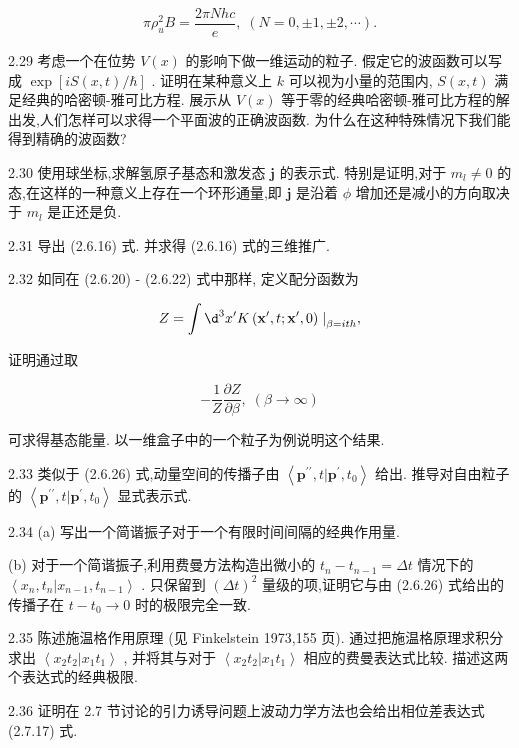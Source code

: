 $$
\pi {\rho }_{u}^{2}B = \frac{2\pi Nhc}{e},\;\left( {N = 0, \pm 1, \pm 2,\cdots }\right) .
$$

2.29 考虑一个在位势 $V\left( x\right)$ 的影响下做一维运动的粒子. 假定它的波函数可以写成 $\exp \left\lbrack {{iS}\left( {x, t}\right) /\hbar }\right\rbrack$ . 证明在某种意义上 $k$ 可以视为小量的范围内, $S\left( {x, t}\right)$ 满足经典的哈密顿-雅可比方程. 展示从 $V\left( x\right)$ 等于零的经典哈密顿-雅可比方程的解出发,人们怎样可以求得一个平面波的正确波函数. 为什么在这种特殊情况下我们能得到精确的波函数?

2.30 使用球坐标,求解氢原子基态和激发态 $\mathbf{j}$ 的表示式. 特别是证明,对于 ${m}_{l} \neq 0$ 的态,在这样的一种意义上存在一个环形通量,即 $\mathbf{j}$ 是沿着 $\phi$ 增加还是减小的方向取决于 ${m}_{l}$ 是正还是负.

2.31 导出 (2.6.16) 式. 并求得 (2.6.16) 式的三维推广.

2.32 如同在 (2.6.20) - (2.6.22) 式中那样, 定义配分函数为

$$
Z = \int {\d}^{3}{x}^{\prime }K\left( {{\mathbf{x}}^{\prime }, t;{\mathbf{x}}^{\prime },0}\right) {\left. \right| }_{\beta = {ith}},
$$

证明通过取

$$
- \frac{1}{Z}\frac{\partial Z}{\partial \beta },\;\left( {\beta \rightarrow \infty }\right)
$$

可求得基态能量. 以一维盒子中的一个粒子为例说明这个结果.

2.33 类似于 (2.6.26) 式,动量空间的传播子由 $\left\langle {{\mathbf{p}}^{\prime \prime }, t | {\mathbf{p}}^{\prime },{t}_{0}}\right\rangle$ 给出. 推导对自由粒子的 $\left\langle {{\mathbf{p}}^{\prime \prime }, t | {\mathbf{p}}^{\prime },{t}_{0}}\right\rangle$ 显式表示式.

2.34 (a) 写出一个简谐振子对于一个有限时间间隔的经典作用量.

(b) 对于一个简谐振子,利用费曼方法构造出微小的 ${t}_{n} - {t}_{n - 1} = {\Delta t}$ 情况下的 $\left\langle {{x}_{n},{t}_{n} | {x}_{n - 1},{t}_{n - 1}}\right\rangle$ . 只保留到 ${\left( \Delta t\right) }^{2}$ 量级的项,证明它与由 (2.6.26) 式给出的传播子在 $t - {t}_{0} \rightarrow 0$ 时的极限完全一致.

2.35 陈述施温格作用原理 (见 Finkelstein 1973,155 页). 通过把施温格原理求积分求出 $\left\langle {{x}_{2}{t}_{2} | {x}_{1}{t}_{1}}\right\rangle$ , 并将其与对于 $\left\langle {{x}_{2}{t}_{2} | {x}_{1}{t}_{1}}\right\rangle$ 相应的费曼表达式比较. 描述这两个表达式的经典极限.

2.36 证明在 2.7 节讨论的引力诱导问题上波动力学方法也会给出相位差表达式 (2.7.17) 式.


